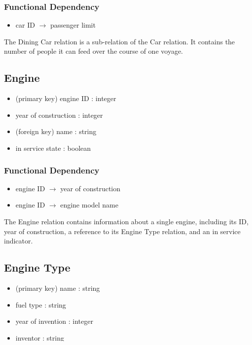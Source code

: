 \documentclass[a4paper]{article}
\begin{document}
\subsubsection*{Functional Dependency}
\begin{itemize}
\item car ID $\rightarrow$ passenger limit
\end{itemize}
The Dining Car relation is a sub-relation of the Car relation. It contains the number of people it can feed over the course of one voyage.

\subsection*{Engine}
\begin{itemize}
\item (primary key) engine ID : integer
\item year of construction : integer
\item (foreign key) name : string
\item in service state : boolean
\end{itemize}
\subsubsection*{Functional Dependency}
\begin{itemize}
\item engine ID $\rightarrow$ year of construction
\item engine ID $\rightarrow$ engine model name
\end{itemize}
The Engine relation contains information about a single engine, including its ID, year of construction, a reference to its Engine Type relation, and an in service indicator.

\subsection*{Engine Type}
\begin{itemize}
\item (primary key) name : string
\item fuel type : string
\item year of invention : integer
\item inventor : string
\item country of origin : string
\item maximum cars pulled : integer
\end{itemize}
The Engine Type relation contains information about different models of engines. It contains an engine type ID, the type of fuel this model uses, the year the model was invented, the inventor's name, the country of origin, and the maximum name of cars this model can pull.
\end{document}
